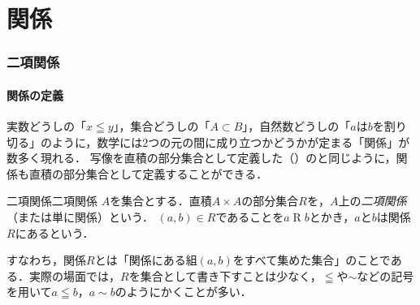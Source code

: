 \part{関係}

\begin{abstract}
この章では，「$=$」「$\leqq$」「$\subset$」のように$2$つの元の間に成り立つかどうかが定まる「関係」を，集合の言葉で定式化する．まず二項関係を直積の部分集合として定義し，反射律・対称律・反対称律・推移律といった性質を整理する．次に，「同じとみなす」ための同値関係を導入し，同値類と商集合を定義して，商集合が集合の分割を与えることを確認する．そのうえで，で述べたwell-definedの概念を商集合上の写像として述べ直し，剰余類の演算を例として扱う．最後に，大小関係を一般化した順序関係に触れよう．
\end{abstract}

\section{二項関係}

\subsection{関係の定義}

実数どうしの「$x \leqq y$」，集合どうしの「$A \subset B$」，自然数どうしの「$a$は$b$を割り切る」のように，数学には$2$つの元の間に成り立つかどうかが定まる「関係」が数多く現れる．
写像を直積の部分集合として定義した（）のと同じように，関係も直積の部分集合として定義することができる．

\begin{definition}{二項関係}{二項関係}
  $A$を集合とする．直積$A \times A$の部分集合$R$を，$A$上の\emph{二項関係}（または単に関係）という．
  $(a, b) \in R$であることを$a \mathrel{R} b$とかき，$a$と$b$は関係$R$にあるという．
\end{definition}

すなわち，関係$R$とは「関係にある組$(a, b)$をすべて集めた集合」のことである．実際の場面では，$R$を集合として書き下すことは少なく，$\leqq$や$\sim$などの記号を用いて$a \leqq b$，$a \sim b$のようにかくことが多い．

